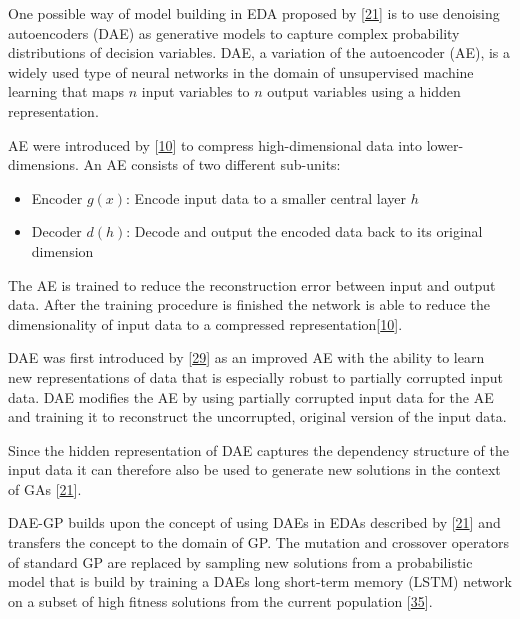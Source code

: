 \documentclass[
  11pt,
]{article}
\providecommand{\tightlist}{%
  \setlength{\itemsep}{0pt}\setlength{\parskip}{0pt}}
\begin{document}
One possible way of model building in EDA proposed by {[}\protect\hyperlink{ref-harmless_overfitting_eda}{21}{]} is to use denoising autoencoders (DAE) as generative models to capture complex probability distributions of decision variables.
DAE, a variation of the autoencoder (AE), is a widely used type of neural networks in the domain of unsupervised machine learning that maps \(n\) input variables to \(n\) output variables using a hidden representation.

AE were introduced by {[}\protect\hyperlink{ref-ae_orig}{10}{]} to compress high-dimensional data into lower-dimensions.
An AE consists of two different sub-units:

\begin{itemize}
\tightlist
\item
  Encoder \(g(x)\): Encode input data to a smaller central layer \(h\)
\item
  Decoder \(d(h)\): Decode and output the encoded data back to its original dimension
\end{itemize}

The AE is trained to reduce the reconstruction error between input and output data.
After the training procedure is finished the network is able to reduce the dimensionality of input data to a compressed representation{[}\protect\hyperlink{ref-ae_orig}{10}{]}.

DAE was first introduced by {[}\protect\hyperlink{ref-dae_orig2008}{29}{]} as an improved AE with the ability to learn new representations of data that is especially robust to partially corrupted input data.
DAE modifies the AE by using partially corrupted input data for the AE and training it to reconstruct the uncorrupted, original version of the input data.

Since the hidden representation of DAE captures the dependency structure of the input data it can therefore also be used to generate new solutions in the context of GAs {[}\protect\hyperlink{ref-harmless_overfitting_eda}{21}{]}.

DAE-GP builds upon the concept of using DAEs in EDAs described by {[}\protect\hyperlink{ref-harmless_overfitting_eda}{21}{]} and transfers the concept to the domain of GP.
The mutation and crossover operators of standard GP are replaced by sampling new solutions from a probabilistic model that is build by training a DAEs long short-term memory (LSTM) network on a subset of high fitness solutions from the current population {[}\protect\hyperlink{ref-dae-gp_2020_rtree}{35}{]}.
\end{document}
